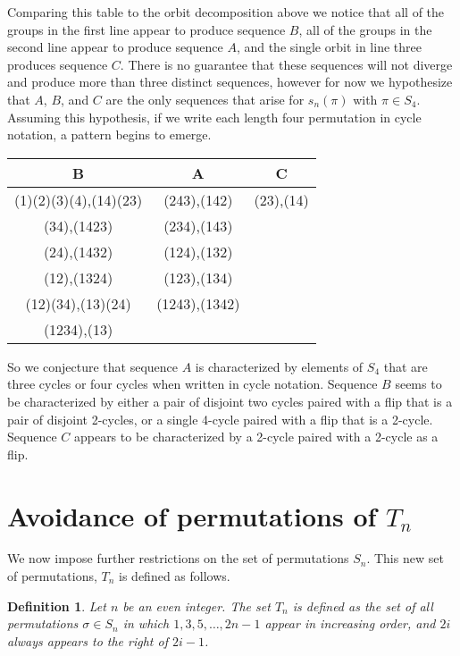 \documentclass[11pt,letterpaper,twoside,english]{article}
\theoremstyle{theorem}
\newtheorem{definition}[theorem]{Definition}
\theoremstyle{remark}
\begin{document}
Comparing this table to the orbit decomposition above we notice that all of the groups in the first line appear to produce sequence $B$, all of the groups in the second line appear to produce sequence $A$, and the single orbit in line three produces sequence $C$. There is no guarantee that these sequences will not diverge and produce more than three distinct sequences, however for now we hypothesize that $A$, $B$, and $C$ are the only sequences that arise for $s_n(\pi)$ with $\pi\in S_4$. Assuming this hypothesis, if we write each length four permutation in cycle notation, a pattern begins to emerge. 

\begin{center}
\begin{tabular}{|c|c|c|}
B &A&C\\
\hline
(1)(2)(3)(4),(14)(23)&(243),(142)&(23),(14)\\
(34),(1423)&(234),(143)&\\
(24),(1432)&(124),(132)&\\
(12),(1324)&(123),(134)&\\
(12)(34),(13)(24)&(1243),(1342)&\\
(1234),(13)&&\\
\end{tabular}
\end{center}

So we conjecture that sequence $A$ is characterized by elements of $S_4$ that are three cycles or four cycles when written in cycle notation. Sequence $B$ seems to be characterized by either a pair of disjoint two cycles paired with a flip that is a pair of disjoint 2-cycles, or a single 4-cycle paired with a flip that is a 2-cycle. Sequence $C$ appears to be characterized by a 2-cycle paired with a 2-cycle as a flip. 


\section{Avoidance of permutations of $T_n$}
\label{Tn}
We now impose further restrictions on the set of permutations $S_n$. This new set of permutations, $T_n$ is defined as follows.

\begin{definition}
Let $n$ be an even integer. The set $T_n$ is defined as the set of all permutations $\sigma \in S_n$ in which $1,3,5,\ldots,2n-1$ appear in increasing order, and $2i$ always appears to the right of $2i-1$.
\end{definition}
\end{document}
